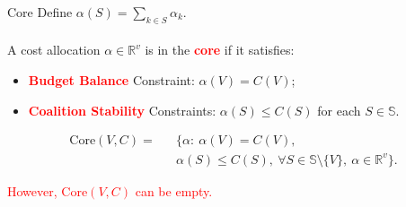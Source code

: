 \documentclass[14pt]{beamer}
\newcommand{\R}{\mathbb{R}}
\begin{document}
\begin{frame}{Core}
Define $\alpha(S)=\sum_{k\in S}\alpha_k$. \\~\\
A cost allocation $\alpha \in \R^v$ is in the \textcolor{red}{\bf core} if it satisfies:
\begin{itemize}
\small
\justifying
	\item \textcolor{red}{\bf Budget Balance} Constraint: $\alpha(V)=C(V)$;
	\item \textcolor{red}{\bf Coalition Stability} Constraints: $\alpha(S)\leq C(S)$ for each  $S\in \mathbb{S}$.
\end{itemize}
\vspace{-12pt}
\begin{eqnarray*}
\mathrm{Core}(V,C) = &&\bigg\{ \alpha:~ \alpha(V)=C(V), \\
&& \alpha(S) \leq C(S), ~\forall S \in \mathbb{S} \setminus \{V\},~\alpha \in \R^v   \bigg\}.
\end{eqnarray*}

\pause
\vspace{-12pt}
\textcolor{red}{However, $\mathrm{Core}(V,C)$ can be empty.}
\end{frame}
\end{document}
